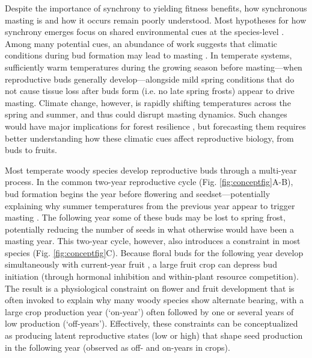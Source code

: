 \documentclass[11pt]{article}
\begin{document}
Despite the importance of synchrony to yielding fitness benefits, how synchronous masting is and how it occurs remain poorly understood.
Most hypotheses for how synchrony emerges focus on shared environmental cues at the species-level \citep{Kelly2002, Bogdziewicz2024}. Among many potential cues, an abundance of work suggests that climatic conditions during bud formation may lead to masting \citep{Nussbaumer2018, Journe2025}. In temperate systems, sufficiently warm temperatures during the growing season before masting---when reproductive buds generally develop---alongside mild spring conditions that do not cause tissue loss after buds form (i.e. no late spring frosts\citep{Vacchiano2017, GallegoZamorano2016}) appear to drive masting. Climate change, however, is rapidly shifting temperatures across the spring and summer\citep{zohner2020pnas,cat2021pep, Schumacher2024}, and thus could disrupt masting dynamics. Such changes would have major implications for forest resilience \citep{Bogdziewicz2023, Foest2024}, but forecasting them requires better understanding how these climatic cues affect reproductive biology, from buds to fruits. %

Most temperate woody species develop reproductive buds through a multi-year process. In the common two-year reproductive cycle (Fig. \ref{fig:conceptfig}A-B), bud formation begins the year before flowering and seedset---potentially explaining why summer temperatures from the previous year appear to trigger masting \citep{Geber1997, Wilkie2008}. The following year some of these buds may be lost to spring frost, potentially reducing the number of seeds in what otherwise would have been a masting year. This two-year cycle, however, also introduces a constraint in most species (Fig. \ref{fig:conceptfig}C). Because floral buds for the following year develop simultaneously with current-year fruit \citep{Geber1997}, a large fruit crop can depress bud initiation (through hormonal inhibition and within-plant resource competition\citep{Monselise1982, Bangerth2009, Milyaev2022}). The result is a physiological constraint on flower and fruit development that is often invoked to explain why many woody species show alternate bearing\citep{Monselise1982, Wilkie2008}, with a large crop production year (`on-year') often followed by one or several years of low production (`off-years'). Effectively, these constraints can be conceptualized as producing latent reproductive states (low or high) that shape seed production in the following year (observed as off- and on-years in crops).
\end{document}
